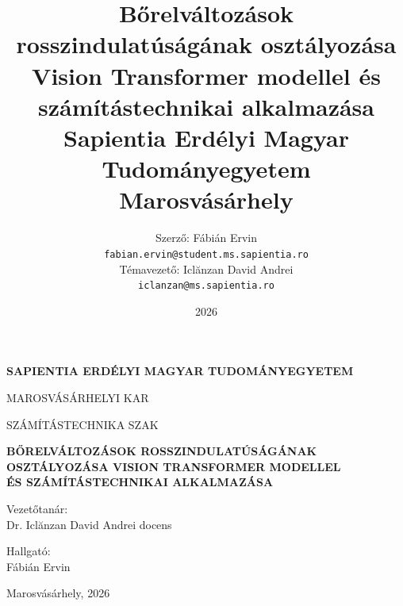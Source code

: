 \documentclass[12pt, twosides]{report}
\title{
	{\LARGE\bfseries Bőrelváltozások rosszindulatúságának osztályozása\\[0.3em]
	Vision Transformer modellel és\\[0.3em]
	számítástechnikai alkalmazása}\\[2em]
	{\large Sapientia Erdélyi Magyar Tudományegyetem\\
	Marosvásárhely}
}
\author{
	{\large Szerző:} Fábián Ervin\\
	\texttt{fabian.ervin@student.ms.sapientia.ro}\\[1.2em]
	{\large Témavezető:} Iclănzan David Andrei\\
	\texttt{iclanzan@ms.sapientia.ro}
}
\date{2026}
\begin{document}
%

\begin{titlepage}
\centering
\linespread{1.25}\selectfont
{\large\bfseries SAPIENTIA ERDÉLYI MAGYAR TUDOMÁNYEGYETEM\par}
\vspace{0.4em}
{\large MAROSVÁSÁRHELYI KAR\par}
\vspace{0.4em}
{\large SZÁMÍTÁSTECHNIKA SZAK\par}

\vfill

{\Large\bfseries BŐRELVÁLTOZÁSOK ROSSZINDULATÚSÁGÁNAK\\[0.35em]
OSZTÁLYOZÁSA VISION TRANSFORMER MODELLEL\\[0.35em]
ÉS SZÁMÍTÁSTECHNIKAI ALKALMAZÁSA\par}

\vfill

\noindent\begin{minipage}[t]{0.5\textwidth}
\raggedright
Vezetőtanár:\\
Dr. Iclănzan David Andrei docens
\end{minipage}%
\begin{minipage}[t]{0.5\textwidth}
\raggedleft
Hallgató:\\
Fábián Ervin
\end{minipage}

\vspace{1.6cm}

{Marosvásárhely, 2026\par}
\end{titlepage}
\end{document}
